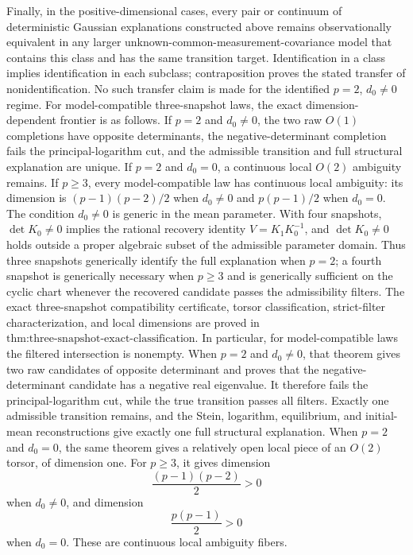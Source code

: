 Finally, in the positive-dimensional cases, every pair or continuum of deterministic Gaussian explanations constructed above remains observationally equivalent in any larger unknown-common-measurement-covariance model that contains this class and has the same transition target.  Identification in a class implies identification in each subclass; contraposition proves the stated transfer of nonidentification.  No such transfer claim is made for the identified \(p=2\), \(d_0\ne0\) regime.
For model-compatible three-snapshot laws, the exact dimension-dependent frontier is as follows.  If \(p=2\) and \(d_0\ne0\), the two raw \(O(1)\) completions have opposite determinants, the negative-determinant completion fails the principal-logarithm cut, and the admissible transition and full structural explanation are unique.  If \(p=2\) and \(d_0=0\), a continuous local \(O(2)\) ambiguity remains.  If \(p\ge3\), every model-compatible law has continuous local ambiguity: its dimension is \((p-1)(p-2)/2\) when \(d_0\ne0\) and \(p(p-1)/2\) when \(d_0=0\).  The condition \(d_0\ne0\) is generic in the mean parameter.  With four snapshots, \(\det K_0\ne0\) implies the rational recovery identity \(V=K_1K_0^{-1}\), and \(\det K_0\ne0\) holds outside a proper algebraic subset of the admissible parameter domain.  Thus three snapshots generically identify the full explanation when \(p=2\); a fourth snapshot is generically necessary when \(p\ge3\) and is generically sufficient on the cyclic chart whenever the recovered candidate passes the admissibility filters.
The exact three-snapshot compatibility certificate, torsor classification, strict-filter characterization, and local dimensions are proved in \(\text{thm:three-snapshot-exact-classification}\).  In particular, for model-compatible laws the filtered intersection is nonempty.  When \(p=2\) and \(d_0\ne0\), that theorem gives two raw candidates of opposite determinant and proves that the negative-determinant candidate has a negative real eigenvalue.  It therefore fails the principal-logarithm cut, while the true transition passes all filters.  Exactly one admissible transition remains, and the Stein, logarithm, equilibrium, and initial-mean reconstructions give exactly one full structural explanation.  When \(p=2\) and \(d_0=0\), the same theorem gives a relatively open local piece of an \(O(2)\) torsor, of dimension one.  For \(p\ge3\), it gives dimension
\[
 \frac{(p-1)(p-2)}2>0
\]
when \(d_0\ne0\), and dimension
\[
 \frac{p(p-1)}2>0
\]
when \(d_0=0\).  These are continuous local ambiguity fibers.

